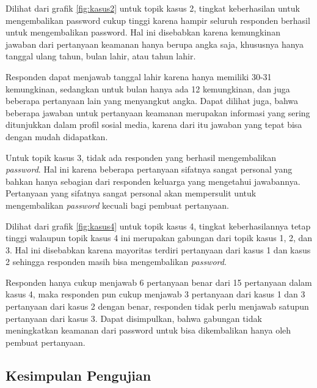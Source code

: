 Dilihat dari grafik \ref{fig:kasus2} untuk topik kasus 2, tingkat keberhasilan untuk mengembalikan password cukup tinggi karena hampir seluruh responden berhasil untuk mengembalikan password. Hal ini disebabkan karena kemungkinan jawaban dari pertanyaan keamanan hanya berupa angka saja, khususnya hanya tanggal ulang tahun, bulan lahir, atau tahun lahir.

Responden dapat menjawab tanggal lahir karena hanya memiliki 30-31 kemungkinan, sedangkan untuk bulan hanya ada 12 kemungkinan, dan juga beberapa pertanyaan lain yang menyangkut angka. Dapat dilihat juga, bahwa beberapa jawaban untuk pertanyaan keamanan merupakan informasi yang sering ditunjukkan dalam profil sosial media, karena dari itu jawaban yang tepat bisa dengan mudah didapatkan.

Untuk topik kasus 3, tidak ada responden yang berhasil mengembalikan \textit{password}. Hal ini karena beberapa pertanyaan sifatnya sangat personal yang bahkan hanya sebagian dari responden keluarga yang mengetahui jawabannya. Pertanyaan yang sifatnya sangat personal akan mempersulit untuk mengembalikan \textit{password} kecuali bagi pembuat pertanyaan.

Dilihat dari grafik \ref{fig:kasus4} untuk topik kasus 4, tingkat keberhasilannya tetap tinggi walaupun topik kasus 4 ini merupakan gabungan dari topik kasus 1, 2, dan 3. Hal ini disebabkan karena mayoritas terdiri pertanyaan dari kasus 1 dan kasus 2 sehingga responden masih bisa mengembalikan \textit{password}.

Responden hanya cukup menjawab 6 pertanyaan benar dari 15 pertanyaan dalam kasus 4, maka responden pun cukup menjawab 3 pertanyaan dari kasus 1 dan 3 pertanyaan dari kasus 2 dengan benar, responden tidak perlu menjawab satupun pertanyaan dari kasus 3. Dapat disimpulkan, bahwa gabungan tidak meningkatkan keamanan dari password untuk bisa dikembalikan hanya oleh pembuat pertanyaan.

\subsection{Kesimpulan Pengujian}

